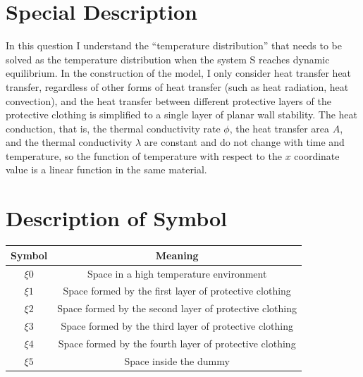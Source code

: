 \documentclass[12pt]{ctexart}
\begin{document}
\section{Special Description}
In this question I understand the “temperature distribution” that needs to be solved as the temperature distribution when the system S reaches dynamic equilibrium.
In the construction of the model, I only consider heat transfer heat transfer, regardless of other forms of heat transfer (such as heat radiation, heat convection), and the heat transfer between different protective layers of the protective clothing is simplified to a single layer of planar wall stability. The heat conduction, that is, the thermal conductivity rate $\phi$, the heat transfer area $A$, and the thermal conductivity $\lambda$ are constant and do not change with time and temperature, so the function of temperature with respect to the $x$ coordinate value is a linear function in the same material.
\section{Description of Symbol}

\begin{center}
\begin{tabular}{c|c}
\toprule
Symbol & Meaning\\
\midrule
$\xi{0}$ & Space in a high temperature environment\\
\midrule
$\xi{1}$ & Space formed by the first layer of protective clothing\\
\midrule
$\xi{2}$ & Space formed by the second layer of protective clothing\\
\midrule
$\xi{3}$ & Space formed by the third layer of protective clothing\\
\midrule
$\xi{4}$ & Space formed by the fourth layer of protective clothing\\
\midrule
$\xi{5}$ & Space inside the dummy\\
\bottomrule
\end{tabular}
\end{center}
\end{document}
